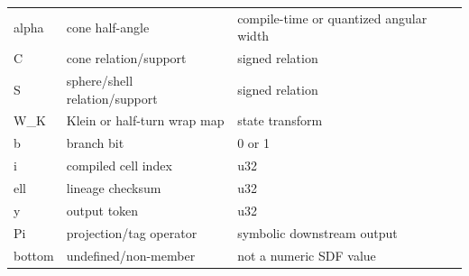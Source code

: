 \begin{longtable}{@{}L{0.16\textwidth}L{0.39\textwidth}L{0.39\textwidth}@{}}
alpha & cone half-angle & compile-time or quantized angular width \\
C & cone relation/support & signed relation \\
S & sphere/shell relation/support & signed relation \\
W\_K & Klein or half-turn wrap map & state transform \\
b & branch bit & 0 or 1 \\
i & compiled cell index & u32 \\
ell & lineage checksum & u32 \\
y & output token & u32 \\
Pi & projection/tag operator & symbolic downstream output \\
bottom & undefined/non-member & not a numeric SDF value \\
\end{longtable}
\normalsize
